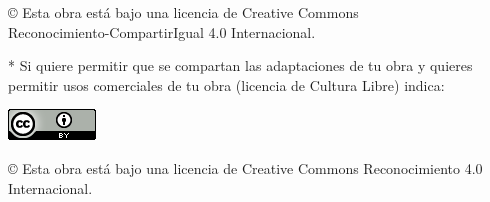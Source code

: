 \documentclass[12pt,a4paper,oneside]{report}
\begin{document}
© Esta obra está bajo una licencia de Creative Commons \\
Reconocimiento-CompartirIgual 4.0 Internacional.

\bigskip
\bigskip
\bigskip
* Si quiere permitir que se compartan las adaptaciones de tu obra y quieres permitir usos comerciales de tu obra (licencia de Cultura Libre) indica:

\begin{center}
\includegraphics[scale=1.8]{images/by_88x31}\\[5mm]
\end{center}

© Esta obra está bajo una licencia de Creative Commons Reconocimiento 4.0 Internacional.

\newpage 
\thispagestyle{empty}



\newpage 
\vspace*{200pt}
\thispagestyle{empty}



\newpage{\pagestyle{empty}}
\thispagestyle{empty}
\pagestyle{myheadings} %



\renewcommand{\thepage}{\roman{page}}
\setcounter{page}{1}
\pagestyle{plain} 


\tableofcontents

\newpage{\pagestyle{empty}}

\listoffigures
\end{document}
